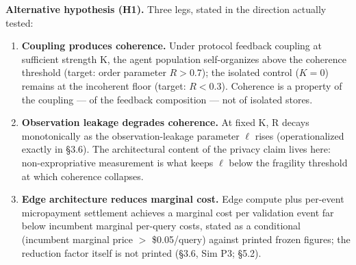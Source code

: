 \documentclass[11pt,twocolumn]{article}
\providecommand{\tightlist}{\setlength{\itemsep}{0pt}\setlength{\parskip}{0pt}}
\begin{document}
\textbf{Alternative hypothesis (H1).} Three legs, stated in the
direction actually tested:

\begin{enumerate}
\def\labelenumi{\arabic{enumi}.}
\tightlist
\item
  \textbf{Coupling produces coherence.} Under protocol feedback coupling
  at sufficient strength K, the agent population self-organizes above
  the coherence threshold (target: order parameter \(R > 0.7\)); the
  isolated control (\(K = 0\)) remains at the incoherent floor (target:
  \(R < 0.3\)). Coherence is a property of the coupling --- of the
  feedback composition --- not of isolated stores.
\item
  \textbf{Observation leakage degrades coherence.} At fixed K, R decays
  monotonically as the observation-leakage parameter \(\ell\) rises
  (operationalized exactly in §3.6). The architectural content of the
  privacy claim lives here: non-expropriative measurement is what keeps
  \(\ell\) below the fragility threshold at which coherence collapses.
\item
  \textbf{Edge architecture reduces marginal cost.} Edge compute plus
  per-event micropayment settlement achieves a marginal cost per
  validation event far below incumbent marginal per-query costs,
  stated as a conditional (incumbent marginal price \(>\) \$0.05/query)
  against printed frozen figures; the reduction factor itself is not
  printed (§3.6, Sim P3; §5.2).
\end{enumerate}
\end{document}
